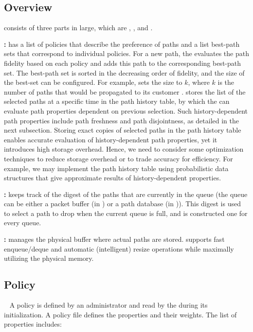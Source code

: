 \subsection{Overview}
\sps consists of three parts in large, which are \pse, \qs, and \sq. 

{\bf \PSE: } \PSE has a list of policies that describe the preference
of paths and a list best-path sets that correspond to individual
policies. For a new path, the \pse evaluates the path fidelity based
on each policy and adds this path to the corresponding best-path
set. The best-path set is sorted in the decreasing order of fidelity,
and the size of the best-set can be configured. For example, \BS sets
the size to $k$, where $k$ is the number of paths that would be
propagated to its customer \AD. \PSE stores the list of the selected
paths at a specific time in the path history table, by which the \pse
can evaluate path properties dependent on previous selection. Such
history-dependent path properties include path freshness and path
disjointness, as detailed in the next subsection. Storing exact copies
of selected paths in the path history table enables accurate
evaluation of history-dependent path properties, yet it introduces
high storage overhead. Hence, we need to consider some optimization
techniques to reduce storage overhead or to trade accuracy for
efficiency. For example, we may implement the path history table using
probabilistic data structures that give approximate results of
history-dependent properties.

{\bf \QS: } \QS keeps track of the digest of the paths that are currently in the queue (the queue can be either a packet buffer (in \BS) or a path database (in \PS)). This digest is used to select a path to drop when the current queue is full, and is constructed one for every queue. 

{\bf \SQ: } \sq manages the physical buffer where actual paths are stored. \sq supports fast enqueue/deque and automatic (intelligent) resize operations while maximally utilizing the physical memory. 

\subsection{Policy}~\label{subsec:policy}
A policy is defined by an administrator and read by the \pse during its initialization. A policy file defines the properties and their weights. The list of properties includes:

